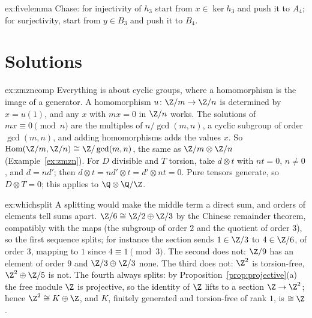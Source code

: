 \begin{hint}{ex:fivelemma}
Chase: for injectivity of $h_3$ start from $x\in\ker h_3$ and push it to $A_4$; for surjectivity, start from $y\in B_3$ and push it to $B_4$.
\end{hint}

\section{Solutions}

\begin{solution}{ex:zmzncomp}
\idea Everything is about cyclic groups, where a homomorphism is the image of a generator.
\writeup A homomorphism $u\colon\Z/m\to\Z/n$ is determined by $x=u(1)$, and any $x$ with $mx=0$ in $\Z/n$ works. The solutions of $mx\equiv0\pmod n$ are the multiples of $n/\gcd(m,n)$, a cyclic subgroup of order $\gcd(m,n)$, and adding
homomorphisms adds the values $x$. So $\operatorname{Hom}(\Z/m,\Z/n)\cong\Z/\gcd(m,n)$, the same as $\Z/m\otimes\Z/n$ (Example~\ref{ex:zmzn}). For $D$ divisible and $T$ torsion, take $d\otimes t$ with $nt=0$, $n\ne0$, and $d=nd'$; then
$d\otimes t=nd'\otimes t=d'\otimes nt=0$. Pure tensors generate, so $D\otimes T=0$; this applies to $\Q\otimes\Q/\Z$.
\end{solution}

\begin{solution}{ex:whichsplit}
\idea A splitting would make the middle term a direct sum, and orders of elements tell sums apart.
\writeup $\Z/6\cong\Z/2\oplus\Z/3$ by the Chinese remainder theorem, compatibly with the maps (the subgroup of order $2$ and the quotient of order $3$), so the first sequence splits; for instance the section sends $1\in\Z/3$ to $4\in\Z/6$, of order $3$,
mapping to $1$ since $4\equiv1\pmod3$. The second does not: $\Z/9$ has an element of order $9$ and $\Z/3\oplus\Z/3$ none. The third does not: $\Z^2$ is torsion-free, $\Z^2\oplus\Z/5$ is not. The fourth always splits: by
Proposition~\ref{prop:projective}(a) the free module $\Z$ is projective, so the identity of $\Z$ lifts to a section $\Z\to\Z^2$; hence $\Z^2\cong K\oplus\Z$, and $K$, finitely generated and torsion-free of rank $1$, is $\cong\Z$.
\end{solution}

